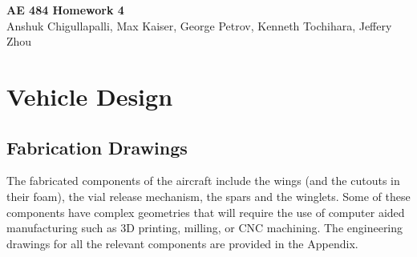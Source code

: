 




\begin{center}
    {\Large\textbf{AE 484 Homework 4}}\\
    Anshuk Chigullapalli, Max Kaiser, George Petrov, Kenneth Tochihara, Jeffery Zhou\\
\end{center}

\section{Vehicle Design}

    \subsection{Fabrication Drawings}
    
        The fabricated components of the aircraft include the  wings (and the cutouts in their foam), the vial release mechanism, the spars and the winglets. Some of these components have complex geometries that will require the use of computer aided manufacturing such as 3D printing, milling, or CNC machining. The engineering drawings for all the relevant components are provided in the Appendix.
    
